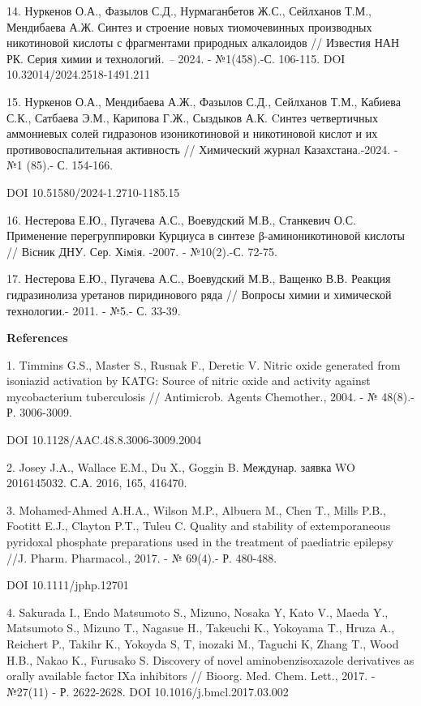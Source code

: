 14. Нуркенов О.А., Фазылов С.Д., Нурмаганбетов Ж.С., Сейлханов Т.М.,
Мендибаева А.Ж. Синтез и строение новых тиомочевинных производных
никотиновой кислоты с фрагментами природных алкалоидов // Известия НАН
РК. Серия химии и технологий\emph{. --} 2024. - №1(458).-С. 106-115. DOI
10.32014/2024.2518-1491.211

15. Нуркенов О.А., Мендибаева А.Ж., Фазылов С.Д., Сейлханов Т.М.,
Кабиева С.К., Сатбаева Э.М., Карипова Г.Ж., Сыздыков А.К. Cинтез
четвертичных аммониевых солей гидразонов изоникотиновой и никотиновой
кислот и их противовоспалительная активность // Химический журнал
Казахстана.-2024. - №1 (85).- С. 154-166.

DOI 10.51580/2024-1.2710-1185.15

16. Нестерова Е.Ю., Пугачева А.С., Воевудский М.В., Станкевич О.С.
Применение перегруппировки Курциуса в синтезе β-аминоникотиновой кислоты
// Вiсник ДНУ. Сер. Хiмiя. -2007. - №10(2).-С. 72-75.

17. Нестерова Е.Ю., Пугачева А.С., Воевудский М.В., Ващенко В.В. Реакция
гидразинолиза уретанов пиридинового ряда // Вопросы химии и химической
технологии.- 2011. - №5.- С. 33-39.

{\bfseries References}

1. Timmins G.S., Master S., Rusnak F., Deretic V. Nitric oxide generated
from isoniazid activation by KATG: Source of nitric oxide and activity
against mycobacterium tuberculosis // Antimicrob. Agents Chemother.,
2004. - № 48(8).- Р. 3006-3009.

DOI 10.1128/AAC.48.8.3006-3009.2004

2. Josey J.A., Wallace E.M., Du X., Goggin B. Междунар. заявка WO
2016145032. С.А. 2016, 165, 416470.

3. Mohamed-Ahmed A.H.A., Wilson M.P., Albuera M., Chen T., Mills P.B.,
Footitt E.J., Clayton P.T., Tuleu C. Quality and stability of
extemporaneous pyridoxal phosphate preparations used in the treatment of
paediatric epilepsy //J. Pharm. Pharmacol., 2017. - № 69(4).- Р.
480-488.

DOI 10.1111/jphp.12701

4. Sakurada I., Endo Matsumoto S., Mizuno, Nosaka Y, Kato V., Maeda Y.,
Matsumoto S., Mizuno T., Nagasue H., Takeuchi K., Yokoyama T., Hruza A.,
Reichert P., Takihr K., Yokoyda S, T, inozaki M., Taguchi K, Zhang T.,
Wood H.B., Nakao K., Furusako S. Discovery of novel aminobenzisoxazole
derivatives as orally available factor IXa inhibitors // Bioorg. Med.
Chem. Lett., 2017. - №27(11) - Р. 2622-2628. DOI
10.1016/j.bmcl.2017.03.002

